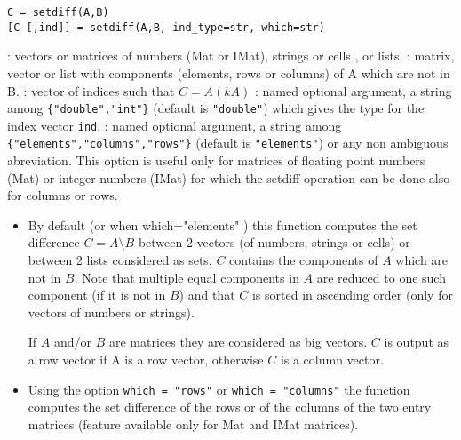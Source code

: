 
\begin{mandesc}
\end{mandesc}

\begin{calling_sequence}
\begin{verbatim}
C = setdiff(A,B)
[C [,ind]] = setdiff(A,B, ind_type=str, which=str)
\end{verbatim}
\end{calling_sequence}
\begin{parameters}
  \begin{varlist}
    :  vectors or matrices of numbers (Mat or IMat), strings or cells , or lists.
    : matrix, vector or list with components (elements, rows or columns) of A which are not in B.
    : vector of indices such that $C=A(kA)$
    : named optional argument, a string among \verb+{"double","int"}+ (default is \verb+"double"+)
    which gives the type for the index vector  \verb+ind+.
    : named optional argument, a string among \verb+{"elements","columns","rows"}+ (default is
    \verb+"elements"+) or any non ambiguous abreviation. This option is useful only for matrices of floating 
       point numbers (Mat) or integer numbers (IMat) for which the setdiff operation can be done also for
       columns or rows.
  \end{varlist}
\end{parameters}

\begin{mandescription}
\begin{itemize}
\item By default  (or when which="elements" ) this function computes the set 
difference $C = A \setminus B$ between 2 vectors (of numbers, strings or cells) or between 2
lists considered as sets. $C$ contains the components of $A$ which are not in $B$. Note that 
multiple equal components in $A$ are reduced to one such component (if it is not in $B$) and that
$C$ is sorted in ascending order (only for vectors of numbers or strings).

If $A$ and/or $B$ are matrices they are considered as big vectors.
$C$ is output as a row vector if  A is a row vector, otherwise $C$ is a column vector.
  

\item  Using the option \verb+which = "rows"+ or \verb+which = "columns"+  the function 
  computes the set difference of the rows or of the columns of the two entry 
  matrices (feature available only for Mat and IMat matrices).

\end{itemize}


\end{mandescription}

